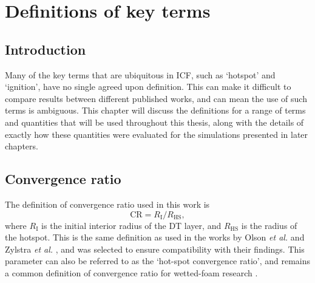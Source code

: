 

\chapter{Definitions of key terms} \label{ch:definitions}

\minitoc

\section{Introduction}

Many of the key terms that are ubiquitous in ICF, such as `hotspot' and `ignition', have no single agreed upon definition. This can make it difficult to compare results between different published works, and can mean the use of such terms is ambiguous. This chapter will discuss the definitions for a range of terms and quantities that will be used throughout this thesis, along with the details of exactly how these quantities were evaluated for the simulations presented in later chapters.


\section{Convergence ratio}
The definition of convergence ratio used in this work is 
\begin{equation} \mathrm{CR} =  R_\mathrm{I}/R_\mathrm{HS}, \label{CR} \end{equation} 
where $R_\mathrm{I}$ is the initial interior radius of the DT layer, and $R_\mathrm{HS}$ is the radius of the hotspot. This is the same definition as used in the works by Olson \textit{et al.} \cite{Olson2016} and Zylstra \textit{et al.} \cite{Zylstra2018}, and was selected to ensure compatibility with their findings. This parameter can also be referred to as the `hot-spot convergence ratio', and remains a common definition of convergence ratio for wetted-foam research \cite{Olson2021}.

